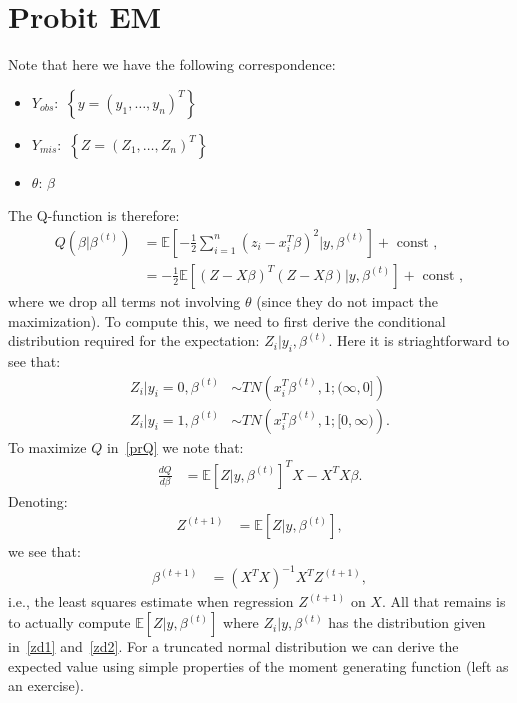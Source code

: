 \documentclass[11pt]{article}
\begin{document}
\section*{Probit EM}
Note that here we have the following correspondence:
\begin{itemize}
\item $Y_{obs}:$ $\left\{y=(y_{1},\ldots,y_{n})^{T}\right\}$
\item $Y_{mis}:$ $\left\{Z=(Z_{1},\ldots,Z_{n})^{T}\right\}$
\item $\theta$: $\beta$
\end{itemize}
The Q-function is therefore:
\begin{align}\label{prQ}
Q(\beta|\beta^{(t)}) &= \mathbb{E}\left[-\frac{1}{2}\sum_{i=1}^{n}\left(z_{i}-x_{i}^{T}\beta\right)^{2}|y,\beta^{(t)}\right] + \textrm{ const } , \\
&= -\frac{1}{2}\mathbb{E}\left[\left(Z-X\beta\right)^{T}\left(Z-X\beta\right) | y,\beta^{(t)} \right] + \textrm{ const } ,
\end{align}
where we drop all terms not involving $\theta$ (since they do not impact the maximization). To compute this, we need to first derive the 
conditional distribution required for the expectation: $Z_{i}|y_{i},\beta^{(t)}$. Here it is striaghtforward to see that:
\begin{align}
\label{zd1}
 Z_{i} | y_{i}=0,\beta^{(t)} &\sim TN\left(x_{i}^{T}\beta^{(t)},1;(\infty,0]\right) \\
 \label{zd2}
 Z_{i} | y_{i}=1,\beta^{(t)} &\sim TN\left(x_{i}^{T}\beta^{(t)},1;[0,\infty)\right) .
\end{align}
To maximize $Q$ in~\eqref{prQ} we note that:
\begin{align*}
 \frac{dQ}{d\beta} &= \mathbb{E}\left[Z|y,\beta^{(t)}\right]^{T}X - X^{T}X\beta .
\end{align*}
Denoting:
\begin{align*}
 Z^{(t+1)} &= \mathbb{E}\left[Z|y,\beta^{(t)}\right] ,
\end{align*}
we see that:
\begin{align}\label{mstep}
 \beta^{(t+1)} &= (X^{T}X)^{-1}X^{T}Z^{(t+1)} ,
\end{align}
i.e., the least squares estimate when regression $Z^{(t+1)}$ on $X$. All that remains is to actually 
compute $\mathbb{E}\left[Z|y,\beta^{(t)}\right]$ where $Z_{i}|y,\beta^{(t)}$ has the distribution
given in~\eqref{zd1} and~\eqref{zd2}. For a truncated normal distribution we can derive the
expected value using simple properties of the moment generating function (left as an exercise).
\end{document}
